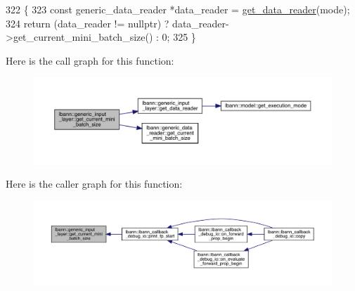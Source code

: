 \begin{DoxyCode}
322                                                                      \{
323     \textcolor{keyword}{const} generic\_data\_reader *data\_reader = \hyperlink{classlbann_1_1generic__input__layer_aba732becdb02627e3ad4493ac19e8fb6}{get\_data\_reader}(mode);
324     \textcolor{keywordflow}{return} (data\_reader != \textcolor{keyword}{nullptr}) ? data\_reader->get\_current\_mini\_batch\_size() : 0;
325   \}
\end{DoxyCode}
Here is the call graph for this function\+:\nopagebreak
\begin{figure}[H]
\begin{center}
\leavevmode
\includegraphics[width=350pt]{classlbann_1_1generic__input__layer_aad7e5f1c51037a175c6bc9abaccdc7d6_cgraph}
\end{center}
\end{figure}
Here is the caller graph for this function\+:\nopagebreak
\begin{figure}[H]
\begin{center}
\leavevmode
\includegraphics[width=350pt]{classlbann_1_1generic__input__layer_aad7e5f1c51037a175c6bc9abaccdc7d6_icgraph}
\end{center}
\end{figure}
\mbox{\label{classlbann_1_1generic__input__layer_a41d278999fbd10d2cd95b9af04925cf7}} 
